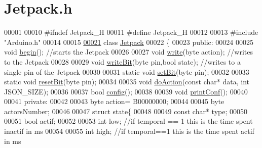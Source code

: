 \hypertarget{_jetpack_8h_source}{}\section{Jetpack.\+h}

\begin{DoxyCode}
00001 
00010 \textcolor{preprocessor}{#ifndef Jetpack\_H}
00011 \textcolor{preprocessor}{#define Jetpack\_H}
00012 
00013 \textcolor{preprocessor}{#include "Arduino.h"}
00014 
00015 
\hyperlink{class_jetpack}{00021} \textcolor{keyword}{class }\hyperlink{class_jetpack}{Jetpack}
00022 \{
00023 \textcolor{keyword}{public}:
00024 
00025     \textcolor{keywordtype}{void} \hyperlink{class_jetpack_a5a53e1ebf7aaf3bf3e0d37ea64ca09a7}{begin}();             \textcolor{comment}{//starts the Jetpack}
00026 
00027     \textcolor{keywordtype}{void} \hyperlink{class_jetpack_a338f1af8cbc6504ac69b47c7328569b5}{write}(byte action);           \textcolor{comment}{//writes to the Jetpack}
00028  
00029     \textcolor{keywordtype}{void} \hyperlink{class_jetpack_a79ae7bc3c1828a0551a7c005c4f8bd00}{writeBit}(byte pin,\textcolor{keywordtype}{bool} state); \textcolor{comment}{//writes to a single pin of the Jetpack}
00030     
00031     \textcolor{keyword}{static} \textcolor{keywordtype}{void} \hyperlink{class_jetpack_a910c9023313d3896fd71a8a55dceeaa2}{setBit}(byte pin);
00032     
00033     \textcolor{keyword}{static} \textcolor{keywordtype}{void} \hyperlink{class_jetpack_ad1142aa8d4d8d0528566a5dc1fe85d54}{resetBit}(byte pin);
00034  
00035     \textcolor{keywordtype}{void} \hyperlink{class_jetpack_a86d2e83436ef4b85f4c3a6e85ac785b0}{doAction}(\textcolor{keyword}{const} \textcolor{keywordtype}{char}* data, \textcolor{keywordtype}{int} JSON\_SIZE);
00036        
00037     \textcolor{keywordtype}{bool} \hyperlink{class_jetpack_ab065ee83e244265a2223a22f3ee4a719}{config}();
00038 
00039     \textcolor{keywordtype}{void} \hyperlink{class_jetpack_ac54a7bb4f9166bee32052253d9b1d306}{printConf}();
00040 
00041 \textcolor{keyword}{private}:
00042 
00043     byte action= B00000000; 
00044     
00045     byte actorsNumber;
00046 
00047     \textcolor{keyword}{struct }state\{
00048     
00049     \textcolor{keyword}{const} \textcolor{keywordtype}{char}* type;
00050 
00051     \textcolor{keywordtype}{bool} actif; 
00052 
00053     \textcolor{keywordtype}{int} low;    \textcolor{comment}{//if temporal == 1 this is the time spent inactif in ms}
00054 
00055     \textcolor{keywordtype}{int} high;   \textcolor{comment}{//if temporal==1 this is the time spent actif in ms}

\end{DoxyCode}
